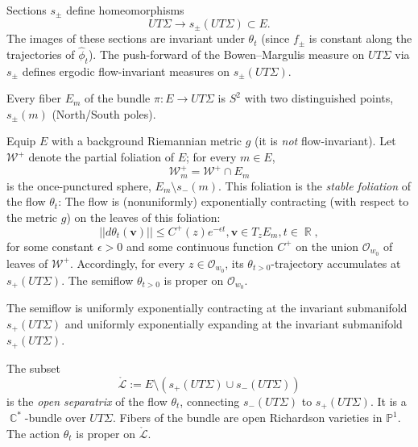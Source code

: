\documentclass[12pt]{amsbook}%
\theoremstyle{definition}
\newtheorem{prob}[thm]{Problem}
\theoremstyle{remark}
\numberwithin{section}{chapter}
\numberwithin{subsection}{section}
\numberwithin{figure}{chapter}
\DeclareMathOperator{\C}{\mathbb{C}}
\DeclareMathOperator{\R}{\mathbb{R}}
\def\eps{\epsilon}
\def\P{{\mathbb{P}}}
\def\cE{{\mathscr{E}}}
\def\cO{{\mathscr{O}}}
\def\cW{{\mathscr{W}}}
\def\bv{\mathbf{v}}
\def\La{\Lambda}
\def\cL{{\mathscr{L}}}
\def\kap{}
\begin{document}
{{Sections $s_\pm$ define homeomorphisms 
$$
UT\Sigma\to s_\pm(UT\Sigma)\subset E. 
$$
The images of these sections are invariant under $\theta_t$ (since $f_\pm$ is constant along the trajectories of $\hat\phi_t$). The push-forward of the Bowen--Margulis measure on $UT\Sigma$ via $s_\pm$ defines ergodic flow-invariant measures on $s_\pm(UT\Sigma)$. 

Every fiber $E_m$ of the bundle $\pi: E\to UT\Sigma$ is $S^2$ with two distinguished points, $s_\pm(m)$ (North/South poles). 

Equip $E$ with a background Riemannian metric $g$ (it is {\em not} flow-invariant). Let $\cW^+$ denote the partial foliation of $E$; for every $m\in E$, 
$$
\cW^+_m= \cW^+\cap E_m
$$
is the once-punctured sphere, $E_m\setminus s_-(m)$. This foliation is the {\em stable foliation} of the flow $\theta_t$: The flow is (nonuniformly) exponentially contracting (with respect to the metric $g$) on the leaves of this foliation:
$$
||d\theta_t(\bv)||\leqslant C^+(z)e^{-\eps t}, \bv\in T_z E_m, t\in \R, 
$$ 
for some constant $\eps>0$ and some continuous function $C^+$ on the union $\cO_{w_0}$ of leaves of  $\cW^+$. 
Accordingly, for every $z\in \cO_{w_0}$, its $\theta_{t>0}$-trajectory accumulates at $s_+(UT\Sigma)$. The semiflow $\theta_{t>0}$ is proper on 
$\cO_{w_0}$. 

The semiflow is uniformly exponentially contracting at the invariant submanifold $s_+(UT\Sigma)$ and 
uniformly exponentially expanding at the invariant submanifold $s_+(UT\Sigma)$. 



The subset
$$
\mathring\cL:= E\setminus (s_+(UT\Sigma)\cup s_-(UT\Sigma))
$$
is the {\em open separatrix} of the flow $\theta_t$, connecting $s_-(UT\Sigma)$ to $s_+(UT\Sigma)$. It is a $\C^*$-bundle over $UT\Sigma$. Fibers 
of the bundle are open Richardson varieties in $\P^1$. The action $\theta_t$ is proper on $\mathring\cL$. 

%
%
%
%
%


}}
\end{document}
